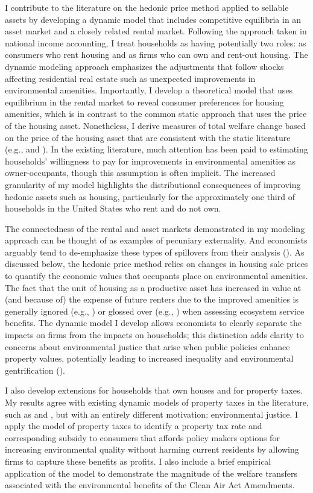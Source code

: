 \documentclass[ecta,nameyear,draft]{econsocart}
\theoremstyle{plain}
\theoremstyle{remark}
\begin{document}
I contribute to the literature on the hedonic price method applied to sellable assets by developing a dynamic model that includes competitive equilibria in an asset market and a closely related rental market. Following the approach taken in national income accounting, I treat households as having potentially two roles: as consumers who rent housing and as firms who can own and rent-out housing. The dynamic modeling approach emphasizes the adjustments that follow shocks affecting residential real estate such as unexpected improvements in environmental amenities. Importantly, I develop a theoretical model that uses equilibrium in the rental market to reveal consumer preferences for housing amenities, which is in contrast to the common static approach that uses the price of the housing asset. Nonetheless, I derive measures of total welfare change based on the price of the housing asset that are consistent with the static literature (e.g., \cite{freeman99} and \cite{freeman14}). In the existing literature, much attention has been paid to estimating households' willingness to pay for improvements in environmental amenities as owner-occupants, though this assumption is often implicit. The increased granularity of my model highlights the distributional consequences of improving hedonic assets such as housing, particularly for the approximately one third of households in the United States who rent and do not own. 

The connectedness of the rental and asset markets demonstrated in my modeling approach can be thought of as examples of pecuniary externality. And economists arguably tend to de-emphasize these types of spillovers from their analysis (\cite{holcombe01}). As discussed below, the hedonic price method relies on changes in housing sale prices to quantify the economic values that occupants place on environmental amenities. The fact that the unit of housing as a productive asset has increased in value at (and because of) the expense of future renters due to the improved amenities is generally ignored (e.g., \cite{bishop20}) or glossed over (e.g., \cite{banzhaf20}) when assessing ecosystem service benefits. The dynamic model I develop allows economists to clearly separate the impacts on firms from the impacts on households; this distinction adds clarity to concerns about environmental justice that arise when public policies enhance property values, potentially leading to increased inequality and environmental gentrification (\cite{banzhafJustice19}). 

I also develop extensions for households that own houses and for property taxes. My results agree with existing dynamic models of property taxes in the literature, such as \cite{freeman80} and \cite{poterba84}, but with an entirely different motivation: environmental justice. I apply the model of property taxes to identify a  property tax rate and corresponding subsidy to consumers that affords policy makers options for increasing environmental quality without harming current residents by allowing firms to capture these benefits as profits. I also include a brief empirical application of the model to demonstrate the magnitude of the welfare transfers associated with the environmental benefits of the Clean Air Act Amendments. 
\end{document}
